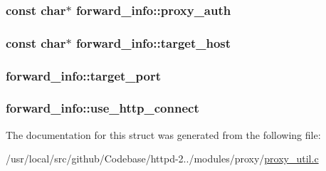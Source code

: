 \subsubsection[{\texorpdfstring{proxy\+\_\+auth}{proxy_auth}}]{\setlength{\rightskip}{0pt plus 5cm}const char$\ast$ forward\+\_\+info\+::proxy\+\_\+auth}\hypertarget{structforward__info_a8d2838aa6f8c5f477a3403c3ff404c3a}{}\label{structforward__info_a8d2838aa6f8c5f477a3403c3ff404c3a}
\subsubsection[{\texorpdfstring{target\+\_\+host}{target_host}}]{\setlength{\rightskip}{0pt plus 5cm}const char$\ast$ forward\+\_\+info\+::target\+\_\+host}\hypertarget{structforward__info_aead08ba3b9577d3735a465be340dbea7}{}\label{structforward__info_aead08ba3b9577d3735a465be340dbea7}
\subsubsection[{\texorpdfstring{target\+\_\+port}{target_port}}]{ forward\+\_\+info\+::target\+\_\+port}\hypertarget{structforward__info_a8869e21f61a36353e6a0e56e56d54d11}{}\label{structforward__info_a8869e21f61a36353e6a0e56e56d54d11}
\subsubsection[{\texorpdfstring{use\+\_\+http\+\_\+connect}{use_http_connect}}]{ forward\+\_\+info\+::use\+\_\+http\+\_\+connect}\hypertarget{structforward__info_a2470d137feb904af212a5d9e524d5d3a}{}\label{structforward__info_a2470d137feb904af212a5d9e524d5d3a}


The documentation for this struct was generated from the following file\+:\begin{DoxyCompactItemize}
\item 
/usr/local/src/github/\+Codebase/httpd-\/2../modules/proxy/\hyperlink{proxy__util_8c}{proxy\+\_\+util.\+c}\end{DoxyCompactItemize}
